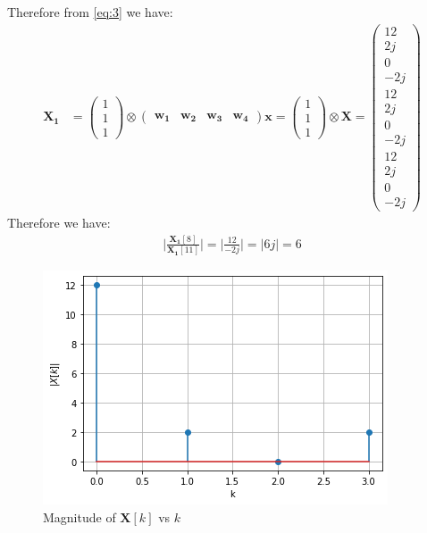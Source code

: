 \documentclass{beamer}
\newcommand{\myvec}[1]{\ensuremath{\begin{pmatrix}#1\end{pmatrix}}}
\renewcommand{\vec}[1]{\mathbf{#1}}
\begin{document}
\begin{frame}
\frametitle{}
Therefore from \eqref{eq:3} we have:
\begin{align}
\vec{X_{1}} &= \myvec{1 \\ 1 \\ 1} \otimes \myvec{\vec{w_{1}} & \vec{w_{2}} & \vec{w_{3}} & \vec{w_{4}}}\vec{x} = \myvec{1 \\ 1 \\ 1} \otimes \vec{X} = \myvec{12 \\ 2j \\ 0 \\ -2j \\ 12 \\ 2j \\ 0 \\ -2j \\ 12 \\ 2j \\ 0 \\-2j}
\end{align}
Therefore we have:
\begin{align}
\Big|{\frac{\vec{X_{1}}[8]}{\vec{X_{1}}[11]}}\Big| = \Big|{\frac{12}{-2j}}\Big| =\big|6j\big| = 6
\end{align}  
\end{frame}

\begin{frame}
\begin{figure}[!ht]
    \centering
    \includegraphics[width=0.9\columnwidth] {Gate_Assignment_1_Fig_1.png}
    \caption{Magnitude of $\vec{X}[k]$ vs $k$}
    \label{Magnitude of X[k]}
\end{figure}
\end{frame}
\end{document}
